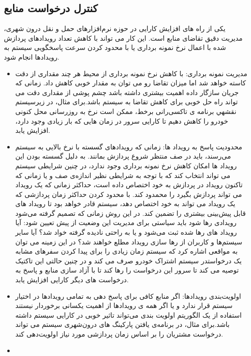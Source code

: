 \subsection{کنترل درخواست منابع}

یکی از راه های افزایش کارایی در حوزه نرم‌افزارهای حمل و نقل درون شهری، مدیریت دقیق تقاضای منابع است. این کار می تواند با کاهش تعداد رویدادهای پردازش شده با اعمال نرخ نمونه برداری یا با محدود کردن سرعت پاسخگویی سیستم به رویدادها انجام شود.
\begin{itemize}
\item
مدیریت نمونه برداری: با کاهش نرخ نمونه برداری از محیط هر چند مقداری از دقت کاسته خواهد شد اما میزان تقاضا رو می توان به مقدار خوبی کاهش داد. زمانی که جریان سازگار داده اهمیت بیشتری داشته باشد چشم پوشی از مقداری دقت می تواند راه حل خوبی برای کاهش تقاضا به سیستم باشد.برای مثال، در زیرسیستم نقشهي برنامه ی تاکسی‌رانی برخط، ممکن است نرخ به روزرسانی محل کنونی خودرو را کاهش دهیم تا کارایی سرور در زمان هایی که بار زیادی وجود دارد، افزایش یابد.
\item
محدودیت پاسخ به رویداد ها: زمانی که رویداد‌های گسسته با نرخ بالایی به سیستم می‌رسند،‌ باید در صف منتظر شروع پردازش بمانند. به دلیل گسسته بودن این رویداد ها امکان کاهش نرخ نمونه برداری وجود ندارد، در چنین شرایطی سیستم می تواند انتخاب کند که با توجه به شرایطی نظیر اندازه‌ی صف و یا زمانی که تاکنون رویداد در پردازش به خود اختصاص داده است، ‌حداکثر زمانی که یک رویداد می تواند پردازش بگیرد را محمدود کند. با محدود کردن حداکثر زمان پردازشی که یک رویداد می تواند به خود اختصاص دهد،‌ سیستم قادر خواهد بود تا رویداد های قابل پیش‌بینی بیشتری را تضمین کند. در این روش زمانی که تصمیم گرفته می‌شود رویدادی رها شود باید سیاستی برای مدیریت این وضعیت از پیش تعیین شود: آیا رویداد های رها شده ثبت می‌شود و یا به راحتی نادیده گرفته خواد شد؟ آیا سایر سیستم‌ها و کاربران از رها سازی رویداد مطلع خواهند شد؟
در این زمینه می توان به مواقعی اشاره کرد که سیستم زمان زیادی را برای پیدا کردن سفر‌های مشابه یک درخواستدر سیستم اشتراک خودرو صرف می کند و در چنین حالتی این تاکتیک توصیه می کند تا سرور این درخواست را رها کند تا با آزاد سازی منابع و پاسخ به درخواست های دیگر کارایی افزایش یابد.  
\item 
اولویت‌بندی رویداد‌ها: اگر منابع کافی برای پاسخ دهی به تمامی رویداد‌ها در اختیار سیستم قرار ندارد و یا اگر همه ی رویداد‌ها از اهمیت یکسانی برخوردار نیستند استفاده از یک الگوریتم اولویت بندی می‌تواند تاثیر خوبی در کارایی سیستم داشته باشد.برای مثال، در برنامه‌ی یافتن پارکینگ های درون‌شهری سیستم می تواند درخواست مشتریان را بر اساس زمان پردازشی مورد نیاز اولویت‌دهی کند.
\item

\end{itemize}
